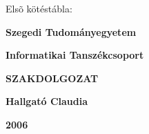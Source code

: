 \documentclass[12pt]{report}
\begin{document}
\thispagestyle{empty}
Elsõ kötéstábla:

\begin{center}
{\Large\bf Szegedi Tudományegyetem}

\vspace{0.5cm}

{\Large\bf Informatikai Tanszékcsoport}

\vspace*{8.5cm}


{\Huge\bf SZAKDOLGOZAT}


\vspace*{7cm}

{\LARGE\bf Hallgató Claudia}

\vspace*{0.6cm}

{\Large\bf 2006}

\end{center}
\end{document}
